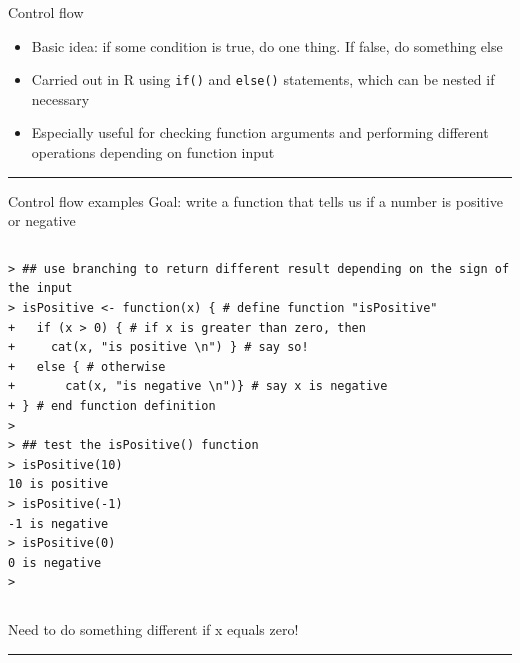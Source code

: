 \documentclass[table,smaller]{beamer}
\begin{document}
\begin{frame}[fragile,label=sec-6-1]{Control flow}
 \begin{itemize}
\item Basic idea: if some condition is true, do one thing. If false, do something else
\item Carried out in R using \verb~if()~ and \verb~else()~ statements, which can be nested if necessary
\item Especially useful for checking function arguments and performing different operations depending on function input
\end{itemize}

\rule{\linewidth}{0.5pt}
\end{frame}
\begin{frame}[fragile,label=sec-6-2]{Control flow examples}
 Goal: write a function that tells us if a number is positive or negative

\vspace{-.5em}
\begin{columns}
\begin{block}{}
\begin{verbatim}
> ## use branching to return different result depending on the sign of the input
> isPositive <- function(x) { # define function "isPositive"
+   if (x > 0) { # if x is greater than zero, then
+     cat(x, "is positive \n") } # say so! 
+   else { # otherwise
+       cat(x, "is negative \n")} # say x is negative
+ } # end function definition 
> 
> ## test the isPositive() function
> isPositive(10)
10 is positive 
> isPositive(-1)
-1 is negative 
> isPositive(0)
0 is negative 
>
\end{verbatim}
\end{block}
\end{columns}
\vspace{.5em}

Need to do something different if x equals zero!

\rule{\linewidth}{0.5pt}
\end{frame}
\end{document}
